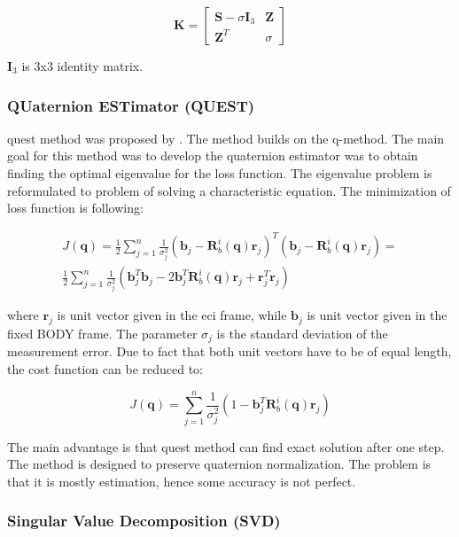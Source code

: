 \documentclass[12pt,a4paper,twoside]{article}
\begin{document}
\begin{equation}
\bm{K} = \begin{bmatrix}
\bm{S} - \sigma\bm{I}_3 & \bm{Z} \\
\bm{Z}^T & \sigma
\end{bmatrix}
\end{equation}

$\bm{I}_3$ is 3x3 identity matrix.

\subsubsection{QUaternion ESTimator (QUEST)}

\gls{quest} method was proposed by \citet{shuster1978approximate}. The method builds on the q-method. The main goal for this method was to develop the quaternion estimator was to obtain finding the optimal eigenvalue for the loss function. The eigenvalue problem is reformulated to problem of solving a characteristic equation. The minimization of loss function is following:

\begin{equation}
\begin{split}
J(\bm{q}) = \frac{1}{2}\sum_{j=1}^n\frac{1}{\sigma_j^2}(\bm{b}_j - \bm{R}_b^i(\bm{q})\bm{r}_j)^T(\bm{b}_j - \bm{R}_b^i(\bm{q})\bm{r}_j) = \\
\frac{1}{2}\sum_{j=1}^n\frac{1}{\sigma_j^2}(\bm{b}_j^T\bm{b}_j - 2\bm{b}_j^T\bm{R}_b^i(\bm{q})\bm{r}_j + \bm{r}_j^T\bm{r}_j)
\end{split}
\end{equation}

where $\bm{r}_j$ is unit vector given in the \gls{eci} frame, while $\bm{b}_j$ is unit vector given in the fixed BODY frame. The parameter $\sigma_j$ is the standard deviation of the measurement error. Due to fact that both unit vectors have to be of equal length, the cost function can be reduced to:

\begin{equation}
J(\bm{q}) = \sum_{j=1}^n\frac{1}{\sigma_j^2}(1 - \bm{b}_j^T\bm{R}_b^i(\bm{q})\bm{r}_j)
\end{equation}

The main advantage is that \gls{quest} method can find exact solution after one step. The method is designed to preserve quaternion normalization. The problem is that it is mostly estimation, hence some accuracy is not perfect.

\subsubsection{Singular Value Decomposition (SVD)}
\end{document}
